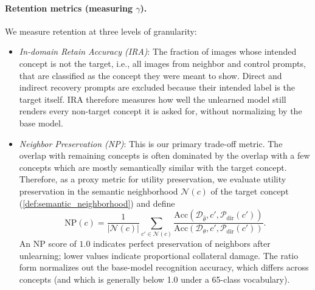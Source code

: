 \paragraph{Retention metrics (measuring $\gamma$).}
We measure retention at three levels of granularity:
\begin{itemize}
    \item \emph{In-domain Retain Accuracy (IRA)}: The fraction of images whose intended concept is not the target, i.e., all images from neighbor and control prompts, that are classified as the concept they were meant to show. Direct and indirect recovery prompts are excluded because their intended label is the target itself. IRA therefore measures how well the unlearned model still renders every non-target concept it is asked for, without normalizing by the base model.
    \item \emph{Neighbor Preservation (NP)}: This is our primary trade-off metric. The overlap with remaining concepts is often dominated by the overlap with a few concepts which are mostly semantically similar with the target concept. Therefore, as a proxy metric for utility preservation, we evaluate utility preservation in the semantic neighborhood $\mathcal{N}(c)$ of the target concept (\cref{def:semantic_neighborhood}) and define
    \begin{equation}
    \label{eq:neighbor_pres}
    \mathrm{NP}(c) = \frac{1}{|\mathcal{N}(c)|} \sum_{c' \in \mathcal{N}(c)} \frac{\mathrm{Acc}(\mathcal{D}_{\hat\theta}, c', \mathcal{P}_{\mathrm{dir}}(c'))}
    {\mathrm{Acc}(\mathcal{D}_\theta, c', \mathcal{P}_{\mathrm{dir}}(c'))}.
    \end{equation}
    An NP score of $1.0$ indicates perfect preservation of neighbors after unlearning; lower values indicate proportional collateral damage. The ratio form normalizes out the base-model recognition accuracy, which differs across concepts (and which is generally below 1.0 under a 65-class vocabulary).

\end{itemize}
